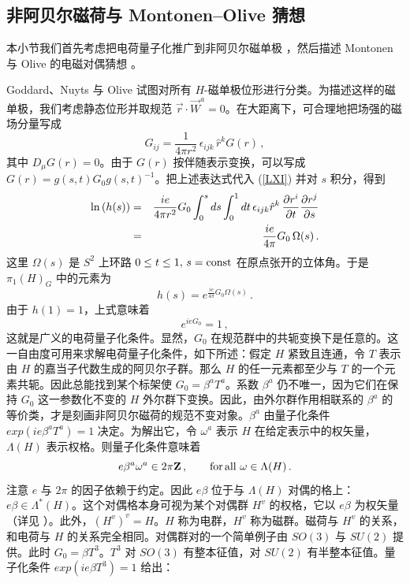 \subsection{非阿贝尔磁荷与 Montonen–Olive 猜想}

本小节我们首先考虑把电荷量子化推广到非阿贝尔磁单极 \cite{GNO}，然后描述 Montonen 与 Olive 的电磁对偶猜想 \cite{MO}。

Goddard、Nuyts 与 Olive \cite{GNO} 试图对所有 $H$-磁单极位形进行分类。为描述这样的磁单极，我们考虑静态位形并取规范 $\vec{r}\cdot\vec{W}^a =0$。在大距离下，可合理地把场强的磁场分量写成
$$
G_{ij} = \frac{1}{4 \pi r^2} \, \epsilon_{ijk} \, \hat{r}^k G(r)\,, 
$$
其中 $D_\mu G(r)=0$。由于 $G(r)$ 按伴随表示变换，可以写成 $G(r)=g(s,t)G_{0}g(s,t)^{-1}$。把上述表达式代入 (\ref{LXI}) 并对 $s$ 积分，得到
\begin{eqnarray}
{\rm ln}\left(h(s)\right) & = & \frac{ie}{4\pi r^2} G_0  
\int^s_0 ds\int^1_0 dt\,\epsilon_{ijk}\hat{r}^k \,
\frac{\partial r^i}{\partial t}\frac{\partial r^j}{\partial s}
\nonumber \\
& = & \frac{ie}{4\pi} G_0\,\Omega (s)\,.
\label{LXX}
\end{eqnarray}
这里 $\Omega (s)$ 是 $S^2$ 上环路 $0\leq t\leq 1,\,s={\rm const}$ 在原点张开的立体角。于是 $\pi_1(H)_G$ 中的元素为
$$
h(s)= e^{\frac{ie}{4 \pi} G_0\Omega(s)}\,. 
$$
由于 $h(1)=1$，上式意味着
\begin{equation}
e^{ie G_0} = 1\,,
\label{LXXI} 
\end{equation}
这就是广义的电荷量子化条件。显然，$G_0$ 在规范群中的共轭变换下是任意的。这一自由度可用来求解电荷量子化条件，如下所述：假定 $H$ 紧致且连通，令 $T$ 表示由 $H$ 的嘉当子代数生成的阿贝尔子群。那么 $H$ 的任一元素都至少与 $T$ 的一个元素共轭。因此总能找到某个标架使 $G_0 = \beta^a T^a$。系数 $\beta^a$ 仍不唯一，因为它们在保持 $G_0$ 这一参数化不变的 $H$ 外尔群下变换。因此，由外尔群作用相联系的 $\beta^a$ 的等价类，才是刻画非阿贝尔磁荷的规范不变对象。$\beta^a$ 由量子化条件 $exp(ie \beta^a T^a)=1$ 决定。为解出它，令 $\omega^a$ 表示 $H$ 在给定表示中的权矢量，$\Lambda(H)$ 表示权格。则量子化条件意味着
$$
e \beta^a \omega^a \in 2\pi{\bf Z}\,,\qquad {\rm for\, all}\,\, 
\omega\in \Lambda(H)\,.
$$      
注意 $e$ 与 $2\pi$ 的因子依赖于约定。因此 $e\beta$ 位于与 $\Lambda(H)$ 对偶的格上：$e\beta \in \Lambda^*(H)$。这个对偶格本身可视为某个对偶群 $H^v$ 的权格，它以 $e\beta$ 为权矢量（详见 \cite{GNO}）。此外，$(H^v)^v=H$。$H$ 称为电群，$H^v$ 称为磁群。磁荷与 $H^v$ 的关系，和电荷与 $H$ 的关系完全相同。对偶群对的一个简单例子由 $SO(3)$ 与 $SU(2)$ 提供。此时 $G_0=\beta T^3$。$T^3$ 对 $SO(3)$ 有整本征值，对 $SU(2)$ 有半整本征值。量子化条件 $exp(ie\beta T^3)=1$ 给出：
